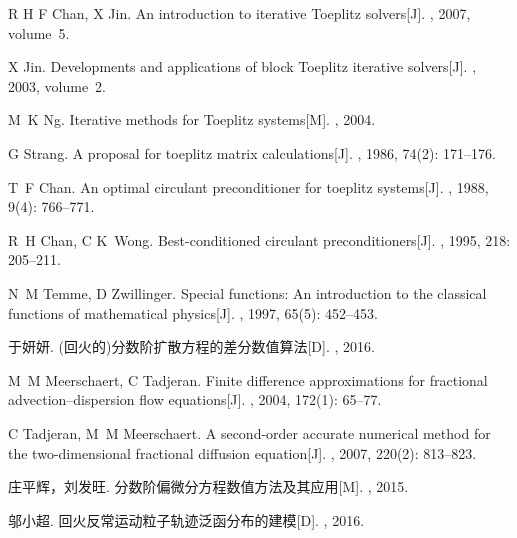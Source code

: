 \documentclass[twoside,UTF8]{nputhesis}
\begin{document}
\begin{thebibliography}{99}
	R H F Chan, X Jin.
	\newblock An introduction to iterative Toeplitz solvers[J].
	, 2007, volume~5.
	
	X Jin.
	\newblock Developments and applications of block Toeplitz iterative
	solvers[J].
	, 2003, volume~2.
	
	M~K Ng.
	\newblock Iterative methods for Toeplitz systems[M].
	, 2004.
	
	G Strang.
	\newblock A proposal for toeplitz matrix calculations[J].
	, 1986, 74(2): 171--176.
	
	T~F Chan.
	\newblock An optimal circulant preconditioner for toeplitz systems[J].
	, 1988, 9(4): 766--771.
	
	R~H Chan, C K~Wong.
	\newblock Best-conditioned circulant preconditioners[J].
	, 1995, 218: 205--211.
	
	N~M Temme, D Zwillinger.
	\newblock Special functions: An introduction to the classical functions of
	mathematical physics[J].
	, 1997, 65(5): 452--453.
	
	于妍妍.
	\newblock (回火的)分数阶扩散方程的差分数值算法[D].
	, 2016.	
	
	M~M Meerschaert, C Tadjeran.
	\newblock Finite difference approximations for fractional advection--dispersion
	flow equations[J].
	, 2004, 172(1): 65--77.	
	
	C Tadjeran, M~M Meerschaert.
	\newblock A second-order accurate numerical method for the two-dimensional
	fractional diffusion equation[J].
	, 2007, 220(2): 813--823.
	
	庄平辉，刘发旺.
	\newblock 分数阶偏微分方程数值方法及其应用[M].
	, 2015.
	
	邬小超.
	\newblock 回火反常运动粒子轨迹泛函分布的建模[D].
	, 2016.
	

\end{thebibliography}
\end{document}
